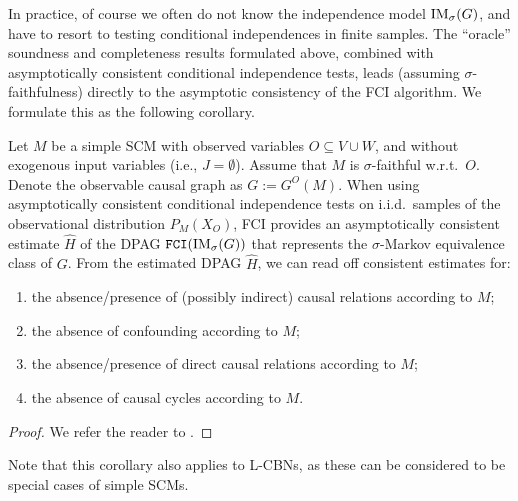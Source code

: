 In practice, of course we often do not know the independence model $\mathrm{IM}_\sigma(G)$, and have to resort to testing conditional independences in finite samples.
The ``oracle'' soundness and completeness results formulated above, combined with asymptotically consistent conditional independence tests, leads (assuming $\sigma$-faithfulness) directly to the asymptotic consistency of the FCI algorithm.
We formulate this as the following corollary.
\begin{Cor}
  Let $M$ be a simple SCM with observed variables $O \subseteq V \cup W$, and without exogenous input variables (i.e., $J = \emptyset$).
  Assume that $M$ is $\sigma$-faithful w.r.t.\ $O$.
  Denote the observable causal graph as $G := G^O(M)$.
  When using asymptotically consistent conditional independence tests on i.i.d.\ samples of the observational distribution $P_{M}(X_O)$, FCI provides an asymptotically consistent estimate $\hat{H}$ of the DPAG $\mathtt{FCI}(\mathrm{IM}_\sigma(G))$ that represents the $\sigma$-Markov equivalence class of $G$. From the estimated DPAG $\hat{H}$, we can read off consistent estimates for:
  \begin{enumerate}[label=(\roman*)]
  \item the absence/presence of (possibly indirect) causal relations according to $M$; 
  \item the absence of confounding according to $M$;
  \item the absence/presence of direct causal relations according to $M$;
  \item the absence of causal cycles according to $M$.
  \end{enumerate}
\end{Cor}
\begin{proof}
  We refer the reader to \cite{MooijClaassen_UAI_20}.
\end{proof}
Note that this corollary also applies to L-CBNs, as these can be considered to be special cases of simple SCMs.

